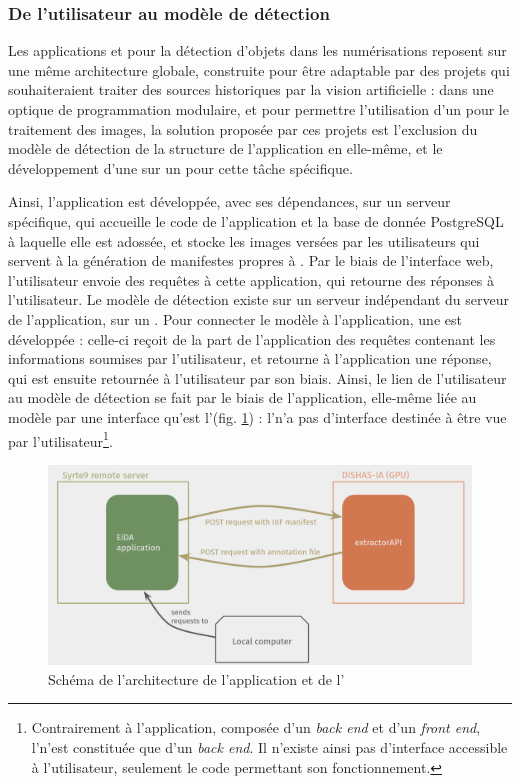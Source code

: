     \subsubsection{De l'utilisateur au modèle de détection}
	Les applications \vhs et \eida pour la détection d'objets dans les numérisations reposent sur une même architecture globale, construite pour être adaptable par des projets qui souhaiteraient traiter des sources historiques par la vision artificielle : dans une optique de programmation modulaire, et pour permettre l'utilisation d'un \gpu pour le traitement des images, la solution proposée par ces projets est l'exclusion du modèle de détection de la structure de l'application en elle-même, et le développement d'une \api sur un \gpu pour cette tâche spécifique.
	
	Ainsi, l'application est développée, avec ses dépendances, sur un serveur spécifique, qui accueille le code de l'application et la base de donnée PostgreSQL à laquelle elle est adossée, et stocke les images versées par les utilisateurs qui servent à la génération de manifestes \iiif propres à \eida. Par le biais de l'interface web, l'utilisateur envoie des requêtes à cette application, qui retourne des réponses à l'utilisateur. Le modèle de détection existe sur un serveur indépendant du serveur de l'application, sur un \gpu. Pour connecter le modèle à l'application, une \api est développée : celle-ci reçoit de la part de l'application \eida des requêtes contenant les informations soumises par l'utilisateur, et retourne à l'application une réponse, qui est ensuite retournée à l'utilisateur par son biais. Ainsi, le lien de l'utilisateur au modèle de détection se fait par le biais de l'application, elle-même liée au modèle par une interface qu'est l'\api (fig. \ref{fig:archi_eida}) : l'\api n'a pas d'interface destinée à être vue par l'utilisateur\footnote{Contrairement à l'application, composée d'un \textit{back end} et d'un \textit{front end}, l'\api n'est constituée que d'un \textit{back end}. Il n'existe ainsi pas d'interface accessible à l'utilisateur, seulement le code permettant son fonctionnement.}.
	
	\begin{figure}[h]
		\centering
		\includegraphics[width=15cm]{images/schema_archi.png}
		\caption{Schéma de l'architecture de l'application \eida et de l'\api \exapi}
		\label{fig:archi_eida}
	\end{figure}


